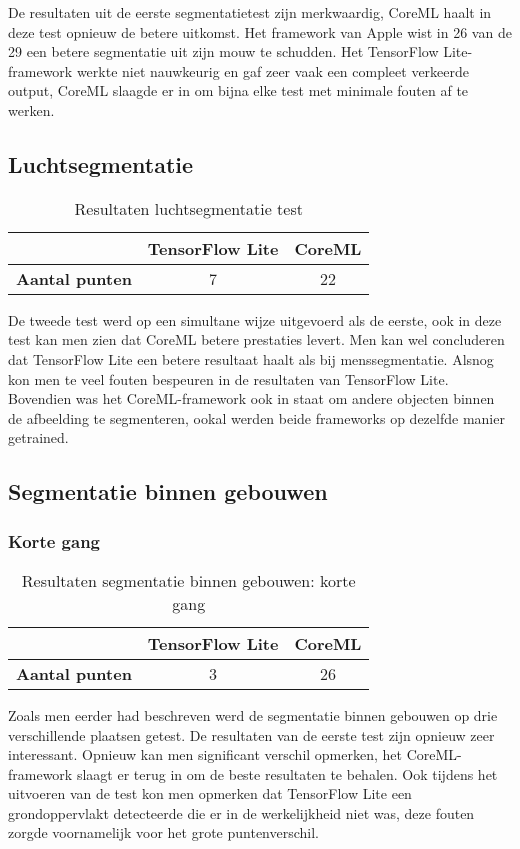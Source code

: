 De resultaten uit de eerste segmentatietest zijn merkwaardig, CoreML haalt in deze test opnieuw de betere uitkomst. Het framework van Apple wist in 26 van de 29 een betere segmentatie uit zijn mouw te schudden. Het TensorFlow Lite-framework werkte niet nauwkeurig en gaf zeer vaak een compleet verkeerde output, CoreML slaagde er in om bijna elke test met minimale fouten af te werken.

\subsection{Luchtsegmentatie}
\begin{table}[H]
	\centering
	\begin{tabular}{|c|c|c|}
		\hline
		& \textbf{TensorFlow Lite} & \textbf{CoreML} \\ \hline
		\textbf{Aantal punten} & 7                        & 22              \\ \hline
	\end{tabular}
	\caption{Resultaten luchtsegmentatie test}
\end{table}

De tweede test werd op een simultane wijze uitgevoerd als de eerste, ook in deze test kan men zien dat CoreML betere prestaties levert. Men kan wel concluderen dat TensorFlow Lite een betere resultaat haalt als bij menssegmentatie. Alsnog kon men te veel fouten bespeuren in de resultaten van TensorFlow Lite. Bovendien was het CoreML-framework ook in staat om andere objecten binnen de afbeelding te segmenteren, ookal werden beide frameworks op dezelfde manier getrained.
\subsection{Segmentatie binnen gebouwen}

\subsubsection{Korte gang}
\begin{table}[H]
	\centering
	\begin{tabular}{|c|c|c|}
		\hline
		& \textbf{TensorFlow Lite} & \textbf{CoreML} \\ \hline
		\textbf{Aantal punten} & 3                        & 26              \\ \hline
	\end{tabular}
	\caption{Resultaten segmentatie binnen gebouwen: korte gang}
\end{table}
Zoals men eerder had beschreven werd de segmentatie binnen gebouwen op drie verschillende plaatsen getest. De resultaten van de eerste test zijn opnieuw zeer interessant. Opnieuw kan men significant verschil opmerken, het CoreML-framework slaagt er terug in om de beste resultaten te behalen. Ook tijdens het uitvoeren van de test kon men opmerken dat TensorFlow Lite een grondoppervlakt detecteerde die er in de werkelijkheid niet was, deze fouten zorgde voornamelijk voor het grote puntenverschil.

